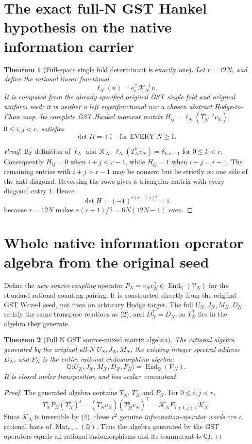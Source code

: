 \documentclass[11pt]{article}
\newtheorem{theorem}{Theorem}
\newcommand{\Q}{\mathbb Q}
\newcommand{\End}{\operatorname{End}}
\begin{document}
\section{The exact full-N GST Hankel hypothesis on the native information carrier}
\begin{theorem}[Full-space single fold determinant is exactly one]
Let $r=12N$, and define the rational linear functional
\[
 \boxed{\ell_N(u)=e_r^\top\mathcal K_N^{-1}u.}\tag{5}
\]
It is computed from the \emph{already specified original} GST single fold and original uniform seed; it is neither a left eigenfunctional nor a chosen abstract Hodge-to-Chow map. Its complete GST Hankel moment matrix
\(H_{ij}=\ell_N(T_N^{i+j}v_N)\), $0\le i,j<r$, satisfies
\[
 \boxed{\det H=+1\quad\text{for EVERY }N\ge1.}\tag{6}
\]
\end{theorem}
\begin{proof}
By definition of $\ell_N$ and $\mathcal K_N$,
\(\ell_N(T_N^k v_N)=\delta_{k,r-1}\) for $0\le k<r$.
Consequently $H_{ij}=0$ when $i+j<r-1$, while $H_{ij}=1$ when $i+j=r-1$. The remaining entries with $i+j>r-1$ may be nonzero but lie strictly on one side of the anti-diagonal. Reversing the rows gives a triangular matrix with every diagonal entry $1$. Hence
\[
 \det H=(-1)^{r(r-1)/2}=1
\]
because $r=12N$ makes $r(r-1)/2=6N(12N-1)$ even.
\end{proof}

\section{Whole native information operator algebra from the original seed}
Define the \emph{new source-coupling} operator
\(P_N=v_Nv_N^\top\in\End_\Q(\mathscr V_N)\)
for the standard rational counting pairing. It is constructed directly from the original GST Wave-I seed, not from an arbitrary Hodge target.
The full $U_N,J_N,M_N,D_N$ satisfy the same transpose relations as (2), and $D_N^\top=D_N$, so $T_N^\top$ lies in the algebra they generate.

\begin{theorem}[Full N GST source-mixed matrix algebra]
The rational algebra generated by the original all-N $U_N,J_N,M_N$, the existing integer spectral address $D_N$, and $P_N$ is the \emph{entire rational endomorphism algebra}:
\[
 \boxed{
 \Q\langle U_N,J_N,M_N,D_N,P_N\rangle
 =\End_\Q(\mathscr V_N).}\tag{7}
\]
It is closed under transposition and has scalar commutant.
\end{theorem}
\begin{proof}
The generated algebra contains $T_N$, $T_N^\top$ and $P_N$.
For $0\le i,j<r$,
\[
 \boxed{
 T_N^iP_N(T_N^\top)^j
   =(T_N^iv_N)(T_N^jv_N)^\top
   =\mathcal K_N E_{i+1,j+1}\mathcal K_N^\top.}\tag{8}
\]
Since $\mathcal K_N$ is invertible by (4), these $r^2$ genuine
\emph{information-operator words} are a rational basis of
$\operatorname{Mat}_{r\times r}(\Q)$. Thus the algebra generated by the GST operators equals all rational endomorphisms and its commutant is $\Q I$.
\end{proof}
\end{document}
